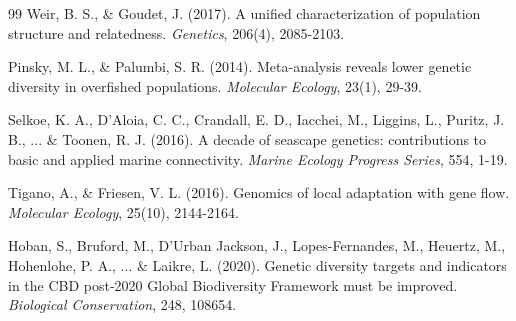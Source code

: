 \documentclass[11pt,a4paper]{article}
\begin{document}
\begin{thebibliography}{99}
 Weir, B. S., \& Goudet, J. (2017). A unified characterization of population structure and relatedness. \textit{Genetics}, 206(4), 2085-2103.

 Pinsky, M. L., \& Palumbi, S. R. (2014). Meta-analysis reveals lower genetic diversity in overfished populations. \textit{Molecular Ecology}, 23(1), 29-39.

 Selkoe, K. A., D'Aloia, C. C., Crandall, E. D., Iacchei, M., Liggins, L., Puritz, J. B., ... \& Toonen, R. J. (2016). A decade of seascape genetics: contributions to basic and applied marine connectivity. \textit{Marine Ecology Progress Series}, 554, 1-19.

 Tigano, A., \& Friesen, V. L. (2016). Genomics of local adaptation with gene flow. \textit{Molecular Ecology}, 25(10), 2144-2164.

 Hoban, S., Bruford, M., D'Urban Jackson, J., Lopes-Fernandes, M., Heuertz, M., Hohenlohe, P. A., ... \& Laikre, L. (2020). Genetic diversity targets and indicators in the CBD post-2020 Global Biodiversity Framework must be improved. \textit{Biological Conservation}, 248, 108654.

\end{thebibliography}
\end{document}
